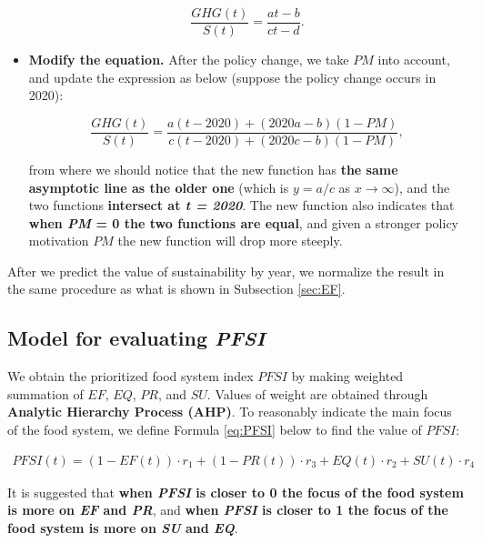 \documentclass[12pt]{article}
\begin{document}
\begin{itemize}
    $$\frac{GHG(t)}{S(t)} = \frac{a t-b}{c t-d}.$$
    \item \textbf{Modify the equation.} After the policy change, we take $PM$ into account, and update the expression as below (suppose the policy change occurs in 2020):
    
    $$\frac{GHG(t)}{S(t)} = \frac{a (t-2020) + (2020 a -b)(1-PM)}{c (t-2020) + (2020 c - b)(1-PM)},$$
    
    from where we should notice that the new function has \textbf{the same asymptotic line as the older one} (which is $y = a/c$ as $x\to \infty$), and the two functions \textbf{intersect at \textit{t = 2020}}. The new function also indicates that \textbf{when \textit{PM} = 0 the two functions are equal}, and given a stronger policy motivation $PM$ the new function will drop more steeply.
\end{itemize}

After we predict the value of sustainability by year, we normalize the result in the same procedure as what is shown in Subsection \ref{sec:EF}.

\subsection{Model for evaluating \textit{PFSI}}
We obtain the prioritized food system index $PFSI$ by making weighted summation of $EF$, $EQ$, $PR$, and $SU$. Values of weight are obtained through \textbf{Analytic Hierarchy Process (AHP)}. To reasonably indicate the main focus of the food system, we define Formula \eqref{eq:PFSI} below to find the value of $PFSI$:

\begin{align}
    \label{eq:PFSI} PFSI(t) = (1-EF(t))\cdot r_1 + (1-PR(t))\cdot r_3 + EQ(t)\cdot r_2 + SU(t)\cdot r_4
\end{align}

It is suggested that \textbf{when \textit{PFSI} is closer to 0 the focus of the food system is more on \textit{EF} and \textit{PR}}, and \textbf{when \textit{PFSI} is closer to 1 the focus of the food system is more on \textit{SU} and \textit{EQ}}.

\end{document}
